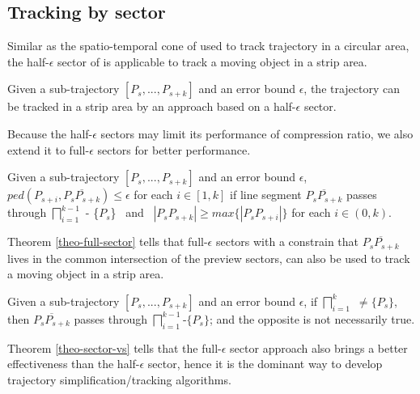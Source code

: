 \subsection{Tracking by sector}

Similar as the spatio-temporal cone of \sed used to track trajectory in a circular area, the half-$\epsilon$ sector of \ped is applicable to track a moving object in a strip area. 



\begin{theorem}
	\label{theo-half-sector}
	Given a sub-trajectory $[P_s,...,P_{s+k}]$ and an error bound $\epsilon$, the trajectory can be tracked in a strip area by an approach based on a half-$\epsilon$ sector.
\end{theorem}

Because the half-$\epsilon$ sectors may limit its performance of compression ratio, we also extend it to full-$\epsilon$ sectors for better performance.

\begin{theorem}
	\label{theo-full-sector}
	Given a sub-trajectory $[P_s,...,P_{s+k}]$ and an error bound $\epsilon$, $ped(P_{s+i}, \overline{P_sP_{s+k}})\le \epsilon$ for each $i \in [1,k]$ if line segment $\overline{P_sP_{s+k}}$ passes through $\bigsqcap_{i=1}^{k-1}$ - \{$P_s$\} ~and~ $|P_sP_{s+k}| \ge max\{|P_sP_{s+i}|\}$ for each $i \in (0, k)$.
\end{theorem}

Theorem \ref{theo-full-sector} tells that full-$\epsilon$ sectors with a constrain that $\overline{P_sP_{s+k}}$ lives in the common intersection of the preview sectors, can also be used to track a moving object in a strip area.

\begin{theorem}
	\label{theo-sector-vs}
	Given a sub-trajectory $[P_s,...,P_{s+k}]$ and an error bound $\epsilon$, if $\bigsqcap_{i=1}^{k}$ $\ne \{P_s\}$, then $\overline{P_sP_{s+k}}$ passes through $\bigsqcap_{i=1}^{k-1}$-$\{P_s\}$; and the opposite is not necessarily true.
\end{theorem}

Theorem \ref{theo-sector-vs} tells that the full-$\epsilon$ sector approach also brings a better effectiveness than the half-$\epsilon$ sector, hence it is the dominant way to develop trajectory simplification/tracking algorithms.


